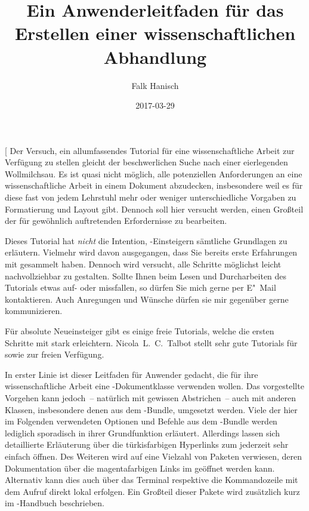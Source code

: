 \documentclass[%
  english,ngerman,%
  cdgeometry=no,DIV=12,%
  cd=false,cdfont=false,cdtitle=true,%
  headings=normal,%
  automark,%
  listof=toc,%
]{tudscrartcl}
\begin{document}
\subject{Tutorial für }
\title{%
  Ein Anwenderleitfaden für das Erstellen einer wissenschaftlichen Abhandlung%
}
\author{Falk Hanisch\TUDScriptContactTitle}
\date{2017-03-29}

\makeatletter
\begingroup%
  \def\and{, }%
  \let\thanks\@gobble%
  \let\footnote\@gobble%
  \let\emailaddress\@gobble%
\endgroup%
\makeatother

\StartTutorial[%
  Der Versuch, ein allumfassendes Tutorial für eine wissenschaftliche Arbeit 
  zur Verfügung zu stellen gleicht der beschwerlichen Suche nach einer 
  eierlegenden Wollmilchsau. Es ist quasi nicht möglich, alle potenziellen 
  Anforderungen an eine wissenschaftliche Arbeit in einem Dokument abzudecken, 
  insbesondere weil es für diese fast von jedem Lehrstuhl mehr oder weniger 
  unterschiedliche Vorgaben zu Formatierung und Layout gibt. Dennoch soll hier 
  versucht werden, einen Großteil der für gewöhnlich auftretenden Erfordernisse
  zu bearbeiten.
  
  Dieses Tutorial hat \emph{nicht} die Intention, -Einsteigern 
  sämtliche Grundlagen zu erläutern. Vielmehr wird davon ausgegangen, dass Sie 
  bereits erste Erfahrungen mit  gesammelt haben. Dennoch wird 
  versucht, alle Schritte möglichst leicht nachvollziehbar zu gestalten. Sollte 
  Ihnen beim Lesen und Durcharbeiten des Tutorials etwas auf- oder missfallen, 
  so dürfen Sie mich gerne per E"~Mail kontaktieren. Auch Anregungen und 
  Wünsche dürfen sie mir gegenüber gerne kommunizieren.
  
  Für absolute Neueinsteiger gibt es einige freie Tutorials, welche die ersten 
  Schritte mit  stark erleichtern. Nicola~L.~C.~Talbot stellt 
  sehr gute Tutorials für 
  \cite{talbot2012} sowie 
  \cite{talbot2013} zur freien Verfügung.
  
  In erster Linie ist dieser Leitfaden für Anwender gedacht, die für ihre
  wissenschaftliche Arbeit eine \TUDScript-Dokumentklasse verwenden wollen. 
  Das vorgestellte Vorgehen kann jedoch~-- natürlich mit gewissen Abstrichen~-- 
  auch mit anderen Klassen, insbesondere denen aus dem \KOMAScript-Bundle, 
  umgesetzt werden. Viele der hier im Folgenden verwendeten Optionen und
  Befehle aus dem \TUDScript-Bundle werden lediglich sporadisch in ihrer 
  Grundfunktion erläutert. Allerdings lassen sich detaillierte Erläuterung über 
  die türkisfarbigen Hyperlinks zum  
  jederzeit sehr einfach öffnen. Des Weiteren wird auf eine Vielzahl von 
  Paketen verwiesen, deren Dokumentation über die magentafarbigen Links im 
  \CTAN geöffnet werden kann. Alternativ kann dies auch über das Terminal 
  respektive die Kommandozeile mit dem Aufruf  
  direkt lokal erfolgen. Ein Großteil dieser Pakete wird zusätzlich kurz im 
  \TUDScript-Handbuch beschrieben.
  
\end{document}

